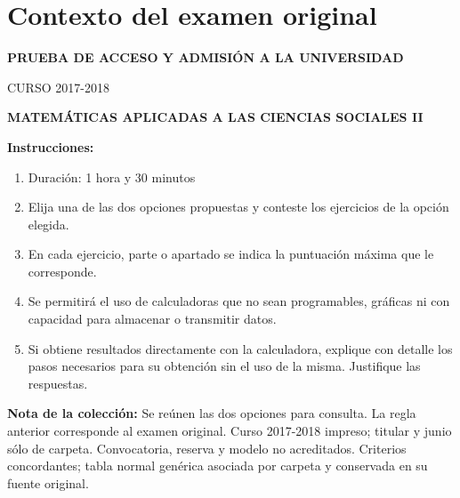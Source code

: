 \section*{Contexto del examen original}
\textbf{PRUEBA DE ACCESO Y ADMISIÓN A LA UNIVERSIDAD}\par
CURSO 2017-2018\par
\textbf{MATEMÁTICAS APLICADAS A LAS CIENCIAS SOCIALES II}

\textbf{Instrucciones:}
\begin{enumerate}[label=\textbf{\alph*)}]
  \item Duración: 1 hora y 30 minutos
  \item Elija una de las dos opciones propuestas y conteste los ejercicios de la opción elegida.
  \item En cada ejercicio, parte o apartado se indica la puntuación máxima que le corresponde.
  \item Se permitirá el uso de calculadoras que no sean programables, gráficas ni con capacidad para almacenar o transmitir datos.
  \item Si obtiene resultados directamente con la calculadora, explique con detalle los pasos necesarios para su obtención sin el uso de la misma. Justifique las respuestas.
\end{enumerate}
\noindent\textbf{Nota de la colección:} Se reúnen las dos opciones para consulta. La regla anterior corresponde al examen original. Curso 2017-2018 impreso; titular y junio sólo de carpeta. Convocatoria, reserva y modelo no acreditados. Criterios concordantes; tabla normal genérica asociada por carpeta y conservada en su fuente original.
\par\medskip
